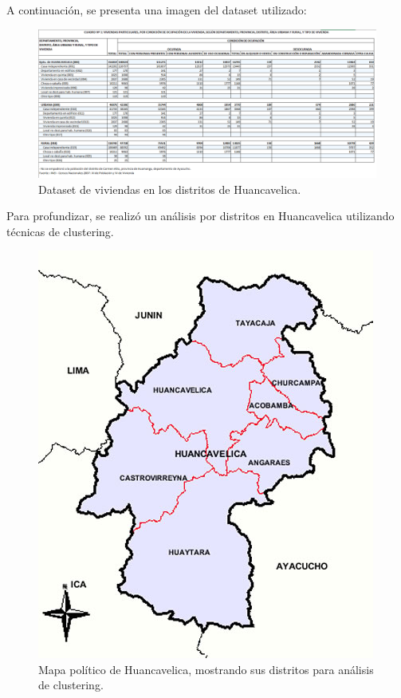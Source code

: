 \documentclass[12pt]{book}
\begin{document}
	A continuación, se presenta una imagen del dataset utilizado:
	
	\begin{figure}[H]
		\centering
		\includegraphics[width=\textwidth]{dataset.png}  %
		\caption{Dataset de viviendas en los distritos de Huancavelica.}
		\label{fig:dataset}
	\end{figure}
	
	Para profundizar, se realizó un análisis por distritos en Huancavelica utilizando técnicas de clustering.
	
	\begin{figure}[H]
		\centering
		\includegraphics[height=0.4\textheight]{huancavelica.jpg}  %
		\caption{Mapa político de Huancavelica, mostrando sus distritos para análisis de clustering.}
		\label{fig:huancavelica}
	\end{figure}
	
\end{document}
